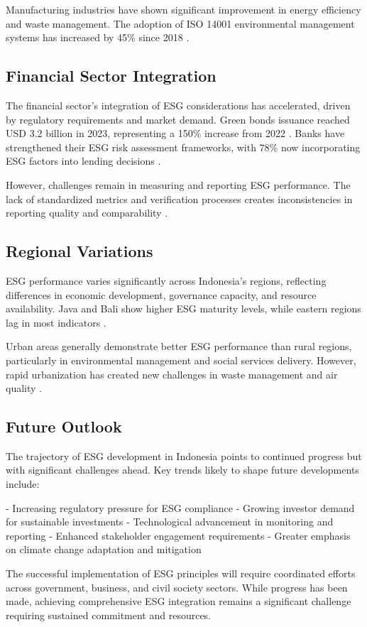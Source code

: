 Manufacturing industries have shown significant improvement in energy efficiency and waste management. The adoption of ISO 14001 environmental management systems has increased by 45\% since 2018 \cite{REF_ID}.

\subsection{Financial Sector Integration}

The financial sector's integration of ESG considerations has accelerated, driven by regulatory requirements and market demand. Green bonds issuance reached USD 3.2 billion in 2023, representing a 150\% increase from 2022 \cite{REF_ID}. Banks have strengthened their ESG risk assessment frameworks, with 78\% now incorporating ESG factors into lending decisions \cite{REF_ID}.

However, challenges remain in measuring and reporting ESG performance. The lack of standardized metrics and verification processes creates inconsistencies in reporting quality and comparability \cite{REF_ID}.

\subsection{Regional Variations}

ESG performance varies significantly across Indonesia's regions, reflecting differences in economic development, governance capacity, and resource availability. Java and Bali show higher ESG maturity levels, while eastern regions lag in most indicators \cite{REF_ID}.

Urban areas generally demonstrate better ESG performance than rural regions, particularly in environmental management and social services delivery. However, rapid urbanization has created new challenges in waste management and air quality \cite{REF_ID}.

\subsection{Future Outlook}

The trajectory of ESG development in Indonesia points to continued progress but with significant challenges ahead. Key trends likely to shape future developments include:

- Increasing regulatory pressure for ESG compliance
- Growing investor demand for sustainable investments
- Technological advancement in monitoring and reporting
- Enhanced stakeholder engagement requirements
- Greater emphasis on climate change adaptation and mitigation

The successful implementation of ESG principles will require coordinated efforts across government, business, and civil society sectors. While progress has been made, achieving comprehensive ESG integration remains a significant challenge requiring sustained commitment and resources.